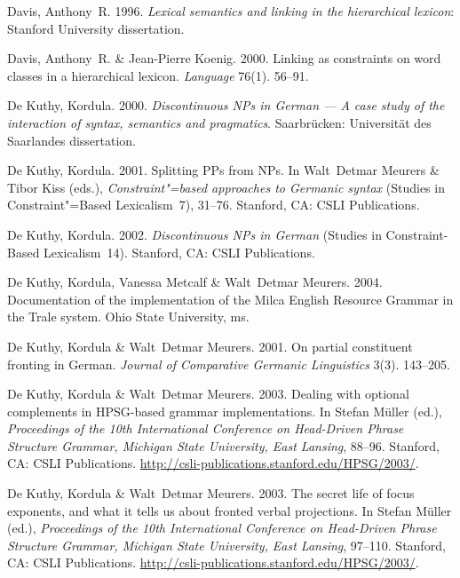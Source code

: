 \begin{thebibliography}{1420}
Davis, Anthony~R. 1996.
\newblock \emph{Lexical semantics and linking in the hierarchical lexicon}:
  Stanford University dissertation.

Davis, Anthony~R. \& Jean-Pierre Koenig. 2000.
\newblock Linking as constraints on word classes in a hierarchical lexicon.
\newblock \emph{Language} 76(1). 56--91.

{De Kuthy}, Kordula. 2000.
\newblock \emph{Discontinuous {NPs} in {German} --- {A} case study of the
  interaction of syntax, semantics and pragmatics}.
\newblock Saarbr{\"u}cken: Universit{\"a}t des Saarlandes dissertation.

{De Kuthy}, Kordula. 2001.
\newblock Splitting {PPs} from {NPs}.
\newblock In Walt~Detmar Meurers \& Tibor Kiss (eds.), \emph{Constraint"=based
  approaches to {Germanic} syntax} (Studies in Constraint"=Based Lexicalism~7),
  31--76. Stanford, CA: CSLI Publications.

{De Kuthy}, Kordula. 2002.
\newblock \emph{Discontinuous {NPs} in {German}} (Studies in Constraint-Based
  Lexicalism~14).
\newblock Stanford, CA: CSLI Publications.

{De Kuthy}, Kordula, Vanessa Metcalf \& Walt~Detmar Meurers. 2004.
\newblock Documentation of the implementation of the {Milca English Resource
  Grammar} in the {Trale} system.
\newblock Ohio State University, ms.

{De Kuthy}, Kordula \& Walt~Detmar Meurers. 2001.
\newblock On partial constituent fronting in {German}.
\newblock \emph{Journal of Comparative Germanic Linguistics} 3(3). 143--205.

{De Kuthy}, Kordula \& Walt~Detmar Meurers. 2003{}.
\newblock Dealing with optional complements in {HPSG}-based grammar
  implementations.
\newblock In Stefan M{\"u}ller (ed.), \emph{Proceedings of the {10th
  International Conference on Head-Driven Phrase Structure Grammar, Michigan
  State University, East Lansing}}, 88--96. Stanford, CA: CSLI Publications.
\newblock \urlprefix\url{http://csli-publications.stanford.edu/HPSG/2003/}.

{De Kuthy}, Kordula \& Walt~Detmar Meurers. 2003{}.
\newblock The secret life of focus exponents, and what it tells us about
  fronted verbal projections.
\newblock In Stefan M{\"u}ller (ed.), \emph{Proceedings of the {10th
  International Conference on Head-Driven Phrase Structure Grammar, Michigan
  State University, East Lansing}}, 97--110. Stanford, CA: CSLI Publications.
\newblock \urlprefix\url{http://csli-publications.stanford.edu/HPSG/2003/}.


\end{thebibliography}
